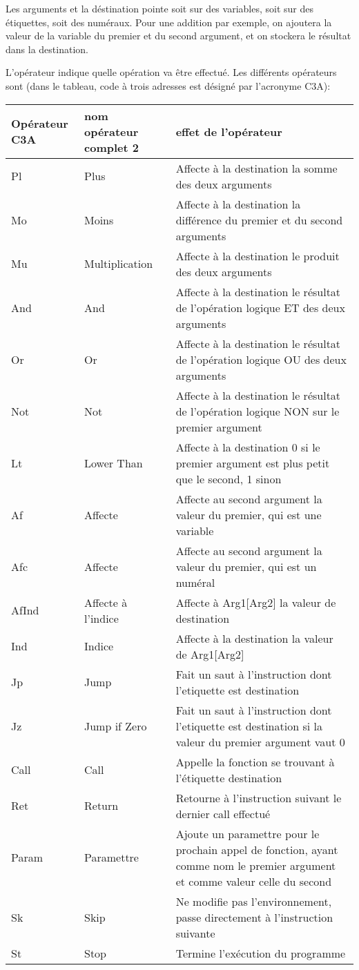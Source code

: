 \documentclass{article}
\begin{document}
Les arguments et la déstination pointe soit sur des variables, soit sur des étiquettes, soit des numéraux. Pour une addition par exemple, on ajoutera la valeur de la variable du premier et du second argument, et on stockera le résultat dans la destination.

L'opérateur indique quelle opération va être effectué. Les différents opérateurs sont (dans le tableau, code à trois adresses est désigné par l'acronyme C3A):

\begin{tabular}{|p{1.5cm}|p{2cm}|p{7cm}|}
  \hline
  Opérateur C3A & nom opérateur complet 2 & effet de l'opérateur \\
  \hline
  \hline
  Pl & Plus & Affecte à la destination la somme des deux arguments \\  \hline
  Mo & Moins & Affecte à la destination la différence du premier et du second arguments \\  \hline
  Mu & Multiplication & Affecte à la destination le produit des deux arguments \\  \hline
  And & And & Affecte à la destination le résultat de l'opération logique ET des deux arguments \\  \hline
  Or & Or & Affecte à la destination le résultat de l'opération logique OU des deux arguments \\  \hline
  Not & Not & Affecte à la destination le résultat de l'opération logique NON sur le premier argument \\  \hline
  Lt & Lower Than & Affecte à la destination 0 si le premier argument est plus petit que le second, 1 sinon\\  \hline
  Af & Affecte & Affecte au second argument la valeur du premier, qui est une variable\\  \hline
  Afc & Affecte & Affecte au second argument la valeur du premier, qui est un numéral\\  \hline
  AfInd & Affecte à l'indice & Affecte à Arg1[Arg2] la valeur de destination\\  \hline
  Ind & Indice & Affecte à la destination la valeur de Arg1[Arg2]\\  \hline
  Jp & Jump & Fait un saut à l'instruction dont l'etiquette est destination\\  \hline
  Jz & Jump if Zero & Fait un saut à l'instruction dont l'etiquette est destination si la valeur du premier argument vaut 0\\  \hline
  Call & Call & Appelle la fonction se trouvant à l'étiquette destination\\  \hline
  Ret & Return & Retourne à l'instruction suivant le dernier call effectué\\  \hline
  Param & Paramettre & Ajoute un paramettre pour le prochain appel de fonction, ayant comme nom le premier argument et comme valeur celle du second\\  \hline
  Sk & Skip & Ne modifie pas l'environnement, passe directement à l'instruction suivante\\  \hline
  St & Stop & Termine l'exécution du programme\\  \hline
\end{tabular}
\end{document}
